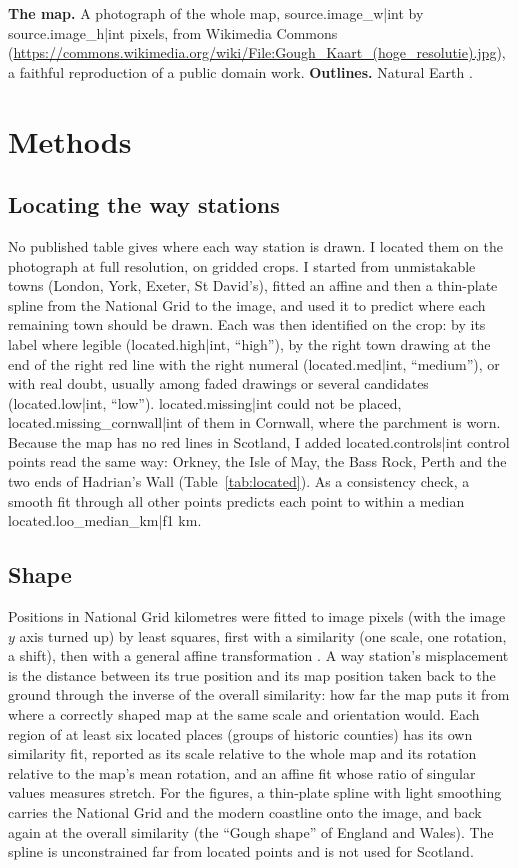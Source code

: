 \documentclass[11pt,a4paper]{article}
\begin{document}
\textbf{The map.} A photograph of the whole map, {{source.image_w|int}} by {{source.image_h|int}} pixels, from Wikimedia Commons (\url{https://commons.wikimedia.org/wiki/File:Gough_Kaart_(hoge_resolutie).jpg}), a faithful reproduction of a public domain work. \textbf{Outlines.} Natural Earth \citep{ne}.

\section{Methods}
\subsection{Locating the way stations}
No published table gives where each way station is drawn. I located them on the photograph at full resolution, on gridded crops. I started from unmistakable towns (London, York, Exeter, St David's), fitted an affine and then a thin-plate spline from the National Grid to the image, and used it to predict where each remaining town should be drawn. Each was then identified on the crop: by its label where legible ({{located.high|int}}, ``high''), by the right town drawing at the end of the right red line with the right numeral ({{located.med|int}}, ``medium''), or with real doubt, usually among faded drawings or several candidates ({{located.low|int}}, ``low''). {{located.missing|int}} could not be placed, {{located.missing_cornwall|int}} of them in Cornwall, where the parchment is worn. Because the map has no red lines in Scotland, I added {{located.controls|int}} control points read the same way: Orkney, the Isle of May, the Bass Rock, Perth and the two ends of Hadrian's Wall (Table~\ref{tab:located}). As a consistency check, a smooth fit through all other points predicts each point to within a median {{located.loo_median_km|f1}} km.

\subsection{Shape}
Positions in National Grid kilometres were fitted to image pixels (with the image $y$ axis turned up) by least squares, first with a similarity (one scale, one rotation, a shift), then with a general affine transformation \citep{tobler}. A way station's misplacement is the distance between its true position and its map position taken back to the ground through the inverse of the overall similarity: how far the map puts it from where a correctly shaped map at the same scale and orientation would. Each region of at least six located places (groups of historic counties) has its own similarity fit, reported as its scale relative to the whole map and its rotation relative to the map's mean rotation, and an affine fit whose ratio of singular values measures stretch. For the figures, a thin-plate spline \citep{bookstein} with light smoothing carries the National Grid and the modern coastline onto the image, and back again at the overall similarity (the ``Gough shape'' of England and Wales). The spline is unconstrained far from located points and is not used for Scotland.
\end{document}
